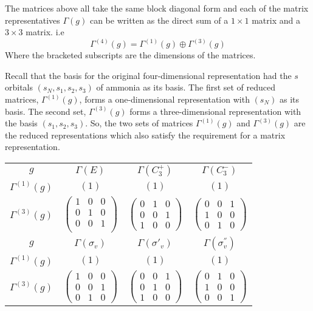 \documentclass[a4paper, 12pt, openany]{report}
\begin{document}
The matrices above all take the same block diagonal form and each of the matrix representatives $\Gamma(g)$ can be written as the direct sum of a $1\times1$ matrix and a $3\times3$ matrix. i.e
$$\Gamma^{(4)}(g)=\Gamma^{(1)}(g)\oplus\Gamma^{(3)}(g)$$
Where the bracketed subscripts are the dimensions of the matrices. 

Recall that
the basis for the original four-dimensional representation had the $s$ orbitals $(s_N,s_1,s_2,s_3)$ of ammonia as its basis.
The first set of reduced matrices, $\Gamma^{(1)}(g)$, forms a one-dimensional representation with $(s_N)$ as its basis. The
second set,	$\Gamma^{(3)}(g)$ forms a three-dimensional representation with the basis $(s_1,s_2,s_3)$. So, the two sets of matrices $\Gamma^{(1)}(g)$ and $\Gamma^{(3)}(g)$ are the reduced representations which also satisfy the requirement  for a matrix representation. 
\begin{table}[H]
\begin{tabular}{cccc}$g$&$\Gamma(E)$ & $\Gamma(C_3^+)$ & 
	$\Gamma(C_3^-)$ \\
	$\Gamma^{(1)}(g)$&$(1)$&$(1)$&$(1)$\\	$\Gamma^{(3)}(g)$&$\begin{pmatrix}
	1&0&0\\0&1&0\\0&0&1\\\end{pmatrix}$&$\begin{pmatrix}
	0&1&0\\0&0&1\\1&0&0\end{pmatrix}$&$\begin{pmatrix}
0&0&1\\1&0&0\\0&1&0\end{pmatrix}$\\\linebreak[5cm]$g$&$ \Gamma(\sigma_v)$& $\Gamma(\sigma'_v)$&$ \Gamma(\sigma_v^{''})$\\	$\Gamma^{(1)}(g)$&$(1)$&$(1)$&$(1)$\\
		$\Gamma^{(3)}(g)$&$\begin{pmatrix}
	1&0&0\\0&0&1\\0&1&0\end{pmatrix}
	$&$\begin{pmatrix}
	0&0&1\\0&1&0\\1&0&0\end{pmatrix}
	$&$ \begin{pmatrix}
	0&1&0\\1&0&0\\0&0&1\end{pmatrix}$
\end{tabular}\end{table}
\end{document}
